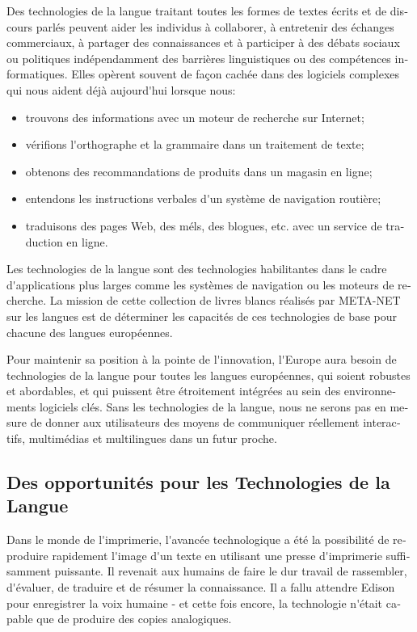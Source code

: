 \begin{french}
\begin{multicols}{2}
Des technologies de la langue traitant toutes les formes de textes
écrits et de discours parlés peuvent aider les individus à collaborer,
à entretenir des échanges commerciaux, à partager des connaissances et
à participer à des débats sociaux ou politiques indépendamment des
barrières linguistiques ou des compétences informatiques. Elles
opèrent souvent de façon cachée dans des logiciels complexes qui nous
aident déjà aujourd{\mbox '}hui lorsque nous:
\begin{itemize}
\item trouvons des informations avec un moteur de recherche sur
  Internet;
\item vérifions l{\mbox '}orthographe et la grammaire dans un
  traitement de texte;
\item obtenons des recommandations de produits dans un magasin en
  ligne;
\item entendons les instructions verbales d{\mbox '}un système de
  navigation routière;
\item traduisons des pages Web, des méls, des blogues, etc. avec un service de traduction en ligne.
\end{itemize}
Les technologies de la langue sont des technologies habilitantes dans
le cadre d{\mbox '}applications plus larges comme les systèmes de
navigation ou les moteurs de recherche. La mission de cette collection
de livres blancs réalisés par META-NET sur les langues est de
déterminer les capacités de ces technologies de base pour chacune des
langues européennes.


Pour maintenir sa position à la pointe de l{\mbox '}innovation,
l{\mbox '}Europe aura besoin de technologies de la langue pour toutes
les langues européennes, qui soient robustes et abordables, et qui
puissent être étroitement intégrées au sein des environnements
logiciels clés. Sans les technologies de la langue, nous ne serons pas
en mesure de donner aux utilisateurs des moyens de communiquer
réellement interactifs, multimédias et multilingues dans un futur
proche.

\subsection{Des opportunités pour les Technologies de la Langue}

Dans le monde de l{\mbox '}imprimerie, l{\mbox '}avancée technologique
a été la possibilité de reproduire rapidement l{\mbox '}image d{\mbox
 '}un texte en utilisant une presse d{\mbox '}imprimerie suffisamment
puissante. Il revenait aux humains de faire le dur travail de
rassembler, d{\mbox '}évaluer, de traduire et de résumer la
connaissance. Il a fallu attendre Edison pour enregistrer la voix
humaine - et cette fois encore, la technologie n{\mbox '}était capable
que de produire des copies analogiques.


\end{multicols}
\end{french}
